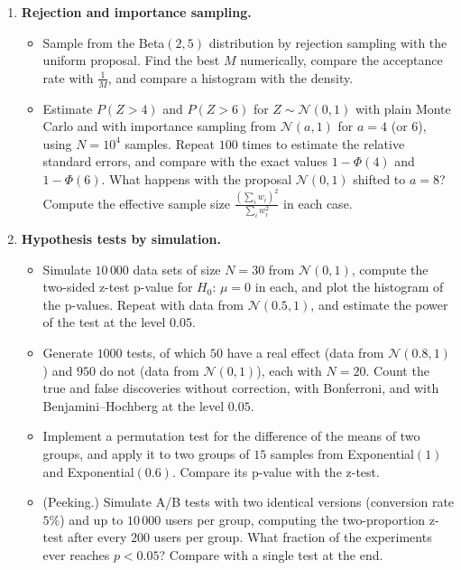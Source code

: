 \begin{enumerate}[label=\textbf{P\arabic*.}, leftmargin=*]
    \item \textbf{Rejection and importance sampling.}
    \begin{itemize}
        \item Sample from the Beta$(2, 5)$ distribution by rejection sampling with the uniform proposal. Find the best $M$ numerically, compare the acceptance rate with $\frac{1}{M}$, and compare a histogram with the density.
        \item Estimate $P(Z > 4)$ and $P(Z > 6)$ for $Z \sim \mathcal{N}(0, 1)$ with plain Monte Carlo and with importance sampling from $\mathcal{N}(a, 1)$ for $a = 4$ (or $6$), using $N = 10^4$ samples. Repeat $100$ times to estimate the relative standard errors, and compare with the exact values $1 - \Phi(4)$ and $1 - \Phi(6)$. What happens with the proposal $\mathcal{N}(0, 1)$ shifted to $a = 8$? Compute the effective sample size $\frac{(\sum_i w_i)^2}{\sum_i w_i^2}$ in each case.
    \end{itemize}

    \item \textbf{Hypothesis tests by simulation.}
    \begin{itemize}
        \item Simulate $10\,000$ data sets of size $N = 30$ from $\mathcal{N}(0, 1)$, compute the two-sided z-test p-value for $H_0$: $\mu = 0$ in each, and plot the histogram of the p-values. Repeat with data from $\mathcal{N}(0.5, 1)$, and estimate the power of the test at the level $0.05$.
        \item Generate $1000$ tests, of which $50$ have a real effect (data from $\mathcal{N}(0.8, 1)$) and $950$ do not (data from $\mathcal{N}(0, 1)$), each with $N = 20$. Count the true and false discoveries without correction, with Bonferroni, and with Benjamini--Hochberg at the level $0.05$.
        \item Implement a permutation test for the difference of the means of two groups, and apply it to two groups of $15$ samples from Exponential$(1)$ and Exponential$(0.6)$. Compare its p-value with the z-test.
        \item (Peeking.) Simulate A/B tests with two identical versions (conversion rate $5\%$) and up to $10\,000$ users per group, computing the two-proportion z-test after every $200$ users per group. What fraction of the experiments ever reaches $p < 0.05$? Compare with a single test at the end.
    \end{itemize}


\end{enumerate}
